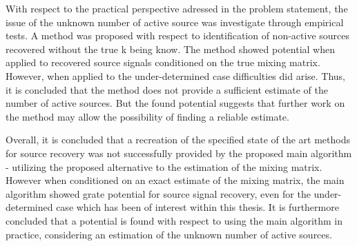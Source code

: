 With respect to the practical perspective adressed in the problem statement, the issue of the unknown number of active source was investigate through empirical tests. A method was proposed with respect to identification of non-active sources recovered without the true k being know.
The method showed potential when applied to recovered source signals conditioned on the true mixing matrix. However, when applied to the under-determined case difficulties did arise. Thus, it is concluded that the method does not provide a sufficient estimate of the number of active sources. But the found potential suggests that further work on the method may allow the possibility of finding a reliable estimate. 

Overall, it is concluded that a recreation of the specified state of the art methods for source recovery was not successfully provided by the proposed main algorithm - utilizing the proposed alternative to the estimation of the mixing matrix. However when conditioned on an exact estimate of the mixing matrix, the main algorithm showed grate potential for source signal recovery, even for the under-determined case which has been of interest within this thesis. 
It is furthermore concluded that a potential is found with respect to using the main algorithm in practice, considering an estimation of the unknown number of active sources. 
